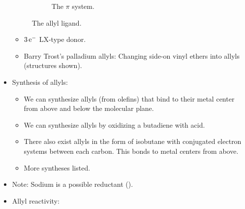\documentclass[../notes.tex]{subfiles}
\begin{document}
\begin{itemize}
\begin{figure}[H]
\begin{subfigure}[b]{0.3\linewidth}
            \caption{The $\pi$ system.}
            \label{fig:ligand-Allylb}
        \end{subfigure}
        \caption{The allyl ligand.}
        \label{fig:ligand-Allyl}
    \end{figure}
    \begin{itemize}
        \item $3\,\e[-]$ LX-type donor.
        \item Barry Trost's palladium allyls: Changing side-on vinyl ethers into allyls (structures shown).
    \end{itemize}
    \item Synthesis of allyls:
    \begin{itemize}
        \item We can synthesize allyls (from olefins) that bind to their metal center from above and below the molecular plane.
        \item We can synthesize allyls by oxidizing a butadiene with acid.
        \item There also exist allyls in the form of isobutane with conjugated electron systems between each carbon. This bonds to metal centers from above.
        \item More syntheses listed.
    \end{itemize}
    \item Note: Sodium is a possible reductant ().
    \item Allyl reactivity:
    \begin{figure}[h!]
        \centering
        \begin{subfigure}[b]{0.9\linewidth}
            \centering
\end{subfigure}
\end{figure}
\end{itemize}
\end{document}
